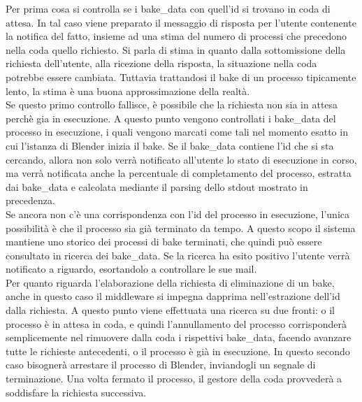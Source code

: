 Per prima cosa si controlla se i bake\_data con quell’id si trovano in coda di attesa. In tal caso viene preparato il messaggio di risposta per l’utente contenente la notifica del fatto, insieme ad una stima del numero di processi che precedono nella coda quello richiesto. Si parla di stima in quanto dalla sottomissione della richiesta dell’utente, alla ricezione della risposta, la situazione nella coda potrebbe essere cambiata. Tuttavia trattandosi il bake di un processo tipicamente lento, la stima è una buona approssimazione della realtà. 
\\
Se questo primo controllo fallisce, è possibile che la richiesta non sia in attesa perchè gia in esecuzione. A questo punto vengono controllati i bake\_data del processo in esecuzione, i quali vengono marcati come tali nel momento esatto in cui l’istanza di Blender inizia il bake. 
Se il bake\_data contiene l’id che si sta cercando, allora non solo verrà notificato all’utente lo stato di esecuzione in corso, ma verrà notificata anche la percentuale di completamento del processo, estratta dai bake\_data e calcolata mediante il parsing dello stdout mostrato in precedenza.
\\ 
Se ancora non c’è una corrispondenza con l’id del processo in esecuzione, l’unica possibilità è che il processo sia già terminato da tempo. A questo scopo il sistema mantiene uno storico dei processi di bake terminati, che quindi può essere consultato in ricerca dei bake\_data. Se la ricerca ha esito positivo l’utente verrà notificato a riguardo, esortandolo a controllare le sue mail. 
\\
Per quanto riguarda l’elaborazione della richiesta di eliminazione di un bake, anche in questo caso il middleware si impegna dapprima nell’estrazione dell’id dalla richiesta. A questo punto viene effettuata una ricerca su due fronti: o il processo è in attesa in coda, e quindi l’annullamento del processo corrisponderà semplicemente nel rimuovere dalla coda i rispettivi bake\_data, facendo avanzare tutte le richieste antecedenti, o il processo è già in esecuzione. In questo secondo caso bisognerà arrestare il processo di Blender, inviandogli un segnale di terminazione. 
Una volta fermato il processo, il gestore della coda provvederà a soddisfare la richiesta successiva.    